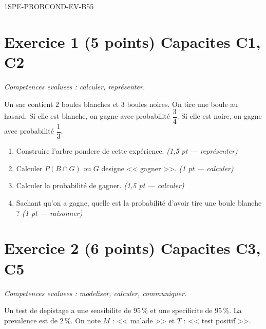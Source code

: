 
\begin{evaluation}{1SPE-PROBCOND-EV-B}{55}

\section*{Exercice 1 \hfill (5 points) \hfill Capacites C1, C2}

\textit{Competences evaluees : calculer, représenter.}

\medskip
Un sac contient $2$ boules blanches et $3$ boules noires. On tire une boule au hasard. Si elle est blanche, on gagne avec probabilité $\dfrac{3}{4}$. Si elle est noire, on gagne avec probabilité $\dfrac{1}{3}$.

\begin{enumerate}
  \item Construire l'arbre pondere de cette expérience.
  \hfill\textit{(1,5 pt --- représenter)}

  \item Calculer $P(B \cap G)$ ou $G$ designe << gagner >>.
  \hfill\textit{(1 pt --- calculer)}

  \item Calculer la probabilité de gagner.
  \hfill\textit{(1,5 pt --- calculer)}

  \item Sachant qu'on a gagne, quelle est la probabilité d'avoir tire une boule blanche ?
  \hfill\textit{(1 pt --- raisonner)}
\end{enumerate}

\section*{Exercice 2 \hfill (6 points) \hfill Capacites C3, C5}

\textit{Competences evaluees : modeliser, calculer, communiquer.}

\medskip
Un test de depistage a une sensibilite de $95\,\%$ et une specificite de $95\,\%$. La prevalence est de $2\,\%$. On note $M$ : << malade >> et $T$ : << test positif >>.


\end{evaluation}
